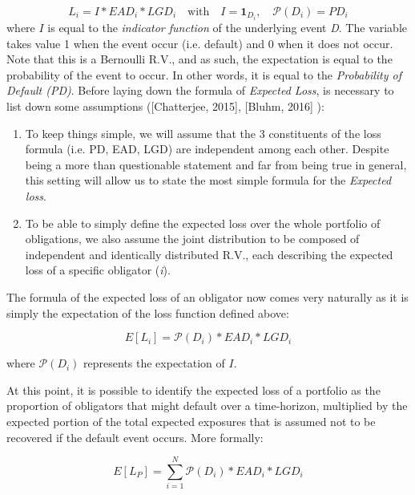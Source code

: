 \documentclass[a4paper,12pt]{article}
\begin{document}
    \begin{equation}
        L_{i}=I*EAD_{i}*LGD_{i} \quad\mathrm{with}\quad  I = \mathrm{\textbf{1}}_{D_{i}}, \quad\mathcal{P}(D_{i}) = PD_{i}
    \end{equation}
    where $I$ is equal to the \textit{indicator function} of the underlying event \textit{D}. The variable takes value 1 when the 
    event occur (i.e. default) and 0 when it does not occur. Note that this is a Bernoulli R.V., and as such, the expectation is equal to the probability of the event to occur. In other words, it is equal to the \textit{Probability of Default (PD)}. 
    Before laying down the formula of \textit{Expected Loss}, is necessary to list down some assumptions ([Chatterjee, 2015], [Bluhm, 2016] ):
    
    \begin{enumerate}
        \item To keep things simple, we will assume that the 3 constituents of the loss formula (i.e. PD, EAD, LGD) are independent among each other. Despite being a more than questionable statement and far from being true in general, this setting will allow us to state the most simple formula for the \textit{Expected loss}.
        \item To be able to simply define the expected loss over the whole portfolio of obligations, we also assume the joint distribution to be composed of independent and identically distributed R.V., each describing the expected loss of a specific obligator (\textit{i}).
    \end{enumerate}

    The formula of the expected loss of an obligator now comes very naturally as it is simply the expectation of the loss function defined above:

        \begin{equation} E[L_{i}]=\mathcal{P}(D_{i})*EAD_{i}*LGD_{i}
        \end{equation}
    
    where $\mathcal{P}(D_{i})$ represents the expectation of $I$.

    At this point, it is possible to identify the expected loss of a portfolio as the proportion of obligators that might default over a time-horizon,
    multiplied by the expected portion of the total expected exposures that is assumed not to be recovered if the default event occurs. More formally:

        \begin{equation} E[L_{P}]=\sum_{i=1}^{N} \mathcal{P}(D_{i})*EAD_{i}*LGD_{i}
        \end{equation}
\end{document}
